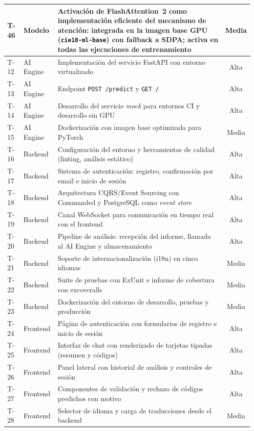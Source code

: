 \begin{center}
\begin{longtable}{llp{7cm}c}
T-46 & Modelo & Activación de FlashAttention~2 como implementación eficiente del mecanismo de atención: integrada en la imagen base GPU (\texttt{cie10-ml-base}) con fallback a SDPA; activa en todas las ejecuciones de entrenamiento & Media \\
\hline
T-12 & AI Engine & Implementación del servicio FastAPI con entorno virtualizado & Alta \\
T-13 & AI Engine & Endpoint \texttt{POST /predict} y \texttt{GET /} & Alta \\
T-14 & AI Engine & Desarrollo del servicio \emph{mock} para entornos CI y desarrollo sin GPU & Alta \\
T-15 & AI Engine & Dockerización con imagen base optimizada para PyTorch & Media \\
\hline
T-16 & Backend & Configuración del entorno y herramientas de calidad (linting, análisis estático) & Alta \\
T-17 & Backend & Sistema de autenticación: registro, confirmación por email e inicio de sesión & Alta \\
T-18 & Backend & Arquitectura CQRS/Event Sourcing con Commanded y PostgreSQL como \emph{event store} & Alta \\
T-19 & Backend & Canal WebSocket para comunicación en tiempo real con el frontend & Alta \\
T-20 & Backend & Pipeline de análisis: recepción del informe, llamada al AI Engine y almacenamiento & Alta \\
T-21 & Backend & Soporte de internacionalización (i18n) en cinco idiomas & Media \\
T-22 & Backend & Suite de pruebas con ExUnit e informe de cobertura con excoveralls & Media \\
T-23 & Backend & Dockerización del entorno de desarrollo, pruebas y producción & Media \\
\hline
T-24 & Frontend & Página de autenticación con formularios de registro e inicio de sesión & Alta \\
T-25 & Frontend & Interfaz de chat con renderizado de tarjetas tipadas (resumen y códigos) & Alta \\
T-26 & Frontend & Panel lateral con historial de análisis y controles de sesión & Alta \\
T-27 & Frontend & Componentes de validación y rechazo de códigos predichos con motivo & Alta \\
T-28 & Frontend & Selector de idioma y carga de traducciones desde el backend & Media \\

\end{longtable}
\end{center}
